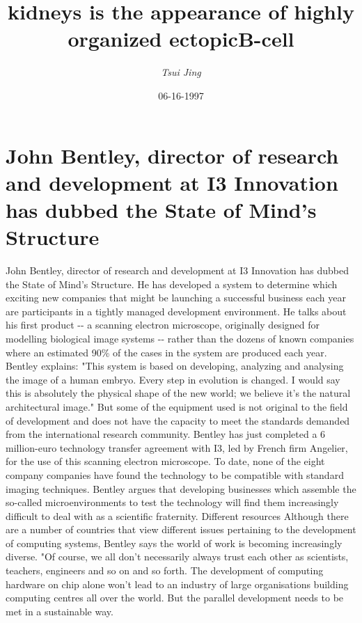 \documentclass{article}%
\title{kidneys is the appearance of highly organized ectopicB{-}cell}%
\author{\textit{Tsui Jing}}%
\date{06-16-1997}%
\begin{document}
%
\normalsize%
\maketitle%
\section{John Bentley, director of research and development at I3 Innovation has dubbed the State of Mind's Structure}%
\label{sec:JohnBentley,directorofresearchanddevelopmentatI3InnovationhasdubbedtheStateofMindsStructure}%
John Bentley, director of research and development at I3 Innovation has dubbed the State of Mind's Structure.\newline%
He has developed a system to determine which exciting new companies that might be launching a successful business each year are participants in a tightly managed development environment. He talks about his first product {-}{-} a scanning electron microscope, originally designed for modelling biological image systems {-}{-} rather than the dozens of known companies where an estimated 90\% of the cases in the system are produced each year. Bentley explains: "This system is based on developing, analyzing and analysing the image of a human embryo. Every step in evolution is changed. I would say this is absolutely the physical shape of the new world; we believe it's the natural architectural image."\newline%
But some of the equipment used is not original to the field of development and does not have the capacity to meet the standards demanded from the international research community. Bentley has just completed a 6 million{-}euro technology transfer agreement with I3, led by French firm Angelier, for the use of this scanning electron microscope. To date, none of the eight company companies have found the technology to be compatible with standard imaging techniques. Bentley argues that developing businesses which assemble the so{-}called microenvironments to test the technology will find them increasingly difficult to deal with as a scientific fraternity.\newline%
Different resources\newline%
Although there are a number of countries that view different issues pertaining to the development of computing systems, Bentley says the world of work is becoming increasingly diverse. "Of course, we all don't necessarily always trust each other as scientists, teachers, engineers and so on and so forth. The development of computing hardware on chip alone won't lead to an industry of large organisations building computing centres all over the world. But the parallel development needs to be met in a sustainable way.\newline%
\end{document}
